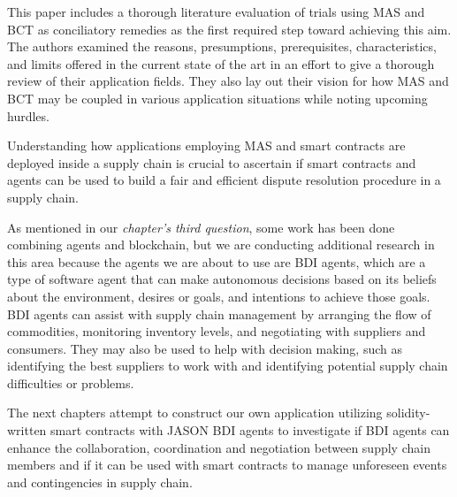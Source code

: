 \begin{itemize}[label={}]
\vspace{.5cm}

This paper\cite{literature} includes a thorough literature evaluation of trials using \ac{MAS} and \ac{BCT} as conciliatory remedies as the first required step toward achieving this aim. The authors examined the reasons, presumptions, prerequisites, characteristics, and limits offered in the current state of the art in an effort to give a thorough review of their application fields. They also lay out their vision for how \ac{MAS} and \ac{BCT} may be coupled in various application situations while noting upcoming hurdles.
\end{itemize}

Understanding how applications employing \ac{MAS} and smart contracts are deployed inside a supply chain is crucial to ascertain if smart contracts and agents can be used to build a fair and efficient dispute resolution procedure in a supply chain. 

\vspace{.5cm}

As mentioned in our \textit{chapter's third question}, some work has been done combining agents and blockchain, but we are conducting additional research in this area because the agents we are about to use are \ac{BDI} agents, which are a type of software agent that can make autonomous decisions based on its beliefs about the environment, desires or goals, and intentions to achieve those goals. \ac{BDI} agents can assist with supply chain management by arranging the flow of commodities, monitoring inventory levels, and negotiating with suppliers and consumers. They may also be used to help with decision making, such as identifying the best suppliers to work with and identifying potential supply chain difficulties or problems.

\vspace{.5cm}

The next chapters attempt to construct our own application utilizing solidity-written smart contracts with JASON BDI agents to investigate if \ac{BDI} agents can enhance the collaboration, coordination and negotiation between supply chain members and if it can be used with smart contracts to manage unforeseen events and contingencies in supply chain.